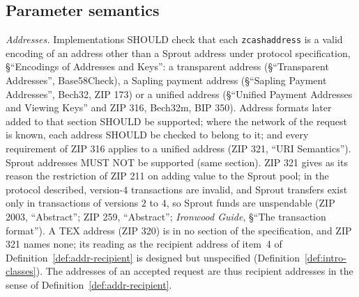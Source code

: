 \documentclass[11pt,a4paper]{article}
\theoremstyle{definition}
\begin{document}
\subsection{Parameter semantics}\label{sec:zip321-params}

\emph{Addresses.} Implementations SHOULD check that each
\texttt{zcashaddress} is a valid encoding of an address other than a Sprout
address under protocol specification, \S``Encodings of Addresses and
Keys'': a transparent address (\S``Transparent Addresses'', Base58Check), a
Sapling payment address (\S``Sapling Payment Addresses'', Bech32, ZIP 173)
or a unified address (\S``Unified Payment Addresses and Viewing Keys'' and
ZIP 316, Bech32m, BIP 350). Address formats later added to that section
SHOULD be supported; where the network of the request is known, each
address SHOULD be checked to belong to it; and every requirement of ZIP 316
applies to a unified address (ZIP 321, ``URI Semantics''). Sprout
addresses MUST NOT be supported (same section). ZIP 321 gives as its reason
the restriction of ZIP 211 on adding value to the Sprout pool; in the
protocol described, version-$4$ transactions are invalid, and Sprout
transfers exist only in transactions of versions $2$ to $4$, so Sprout
funds are unspendable (ZIP 2003, ``Abstract''; ZIP 259, ``Abstract'';
\emph{Ironwood Guide}, \S``The transaction format''). A TEX address (ZIP
320) is in no section of the specification, and ZIP 321 names none; its
reading as the recipient address of item~4 of
Definition~\ref{def:addr-recipient} is designed but unspecified
(Definition~\ref{def:intro-classes}). The addresses of an accepted request
are thus recipient addresses in the sense of
Definition~\ref{def:addr-recipient}.
\end{document}

